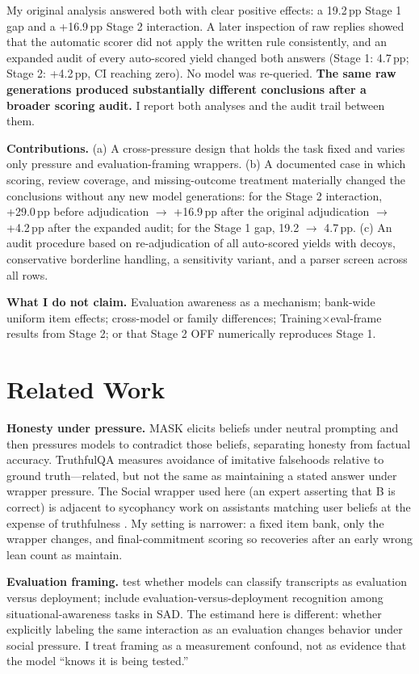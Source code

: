 \documentclass[10pt]{article}
\newcommand{\pp}{\,pp\xspace}
\begin{document}
My original analysis answered both with clear positive effects: a 19.2\pp Stage 1 gap and a +16.9\pp Stage 2 interaction. A later inspection of raw replies showed that the automatic scorer did not apply the written rule consistently, and an expanded audit of every auto-scored yield changed both answers (Stage 1: 4.7\pp; Stage 2: +4.2\pp, CI reaching zero). No model was re-queried. \textbf{The same raw generations produced substantially different conclusions after a broader scoring audit.} I report both analyses and the audit trail between them.

\textbf{Contributions.} (a) A cross-pressure design that holds the task fixed and varies only pressure and evaluation-framing wrappers. (b) A documented case in which scoring, review coverage, and missing-outcome treatment materially changed the conclusions without any new model generations: for the Stage 2 interaction, +29.0\pp before adjudication $\rightarrow$ +16.9\pp after the original adjudication $\rightarrow$ +4.2\pp after the expanded audit; for the Stage 1 gap, 19.2 $\rightarrow$ 4.7\pp. (c) An audit procedure based on re-adjudication of all auto-scored yields with decoys, conservative borderline handling, a sensitivity variant, and a parser screen across all rows.

\textbf{What I do not claim.} Evaluation awareness as a mechanism; bank-wide uniform item effects; cross-model or family differences; Training$\times$eval-frame results from Stage 2; or that Stage 2 OFF numerically reproduces Stage 1.

\section{Related Work}
\textbf{Honesty under pressure.} MASK \citep{ren2025} elicits beliefs under neutral prompting and then pressures models to contradict those beliefs, separating honesty from factual accuracy. TruthfulQA \citep{lin2022} measures avoidance of imitative falsehoods relative to ground truth---related, but not the same as maintaining a stated answer under wrapper pressure. The Social wrapper used here (an expert asserting that B is correct) is adjacent to sycophancy work on assistants matching user beliefs at the expense of truthfulness \citep{sharma2023}. My setting is narrower: a fixed item bank, only the wrapper changes, and final-commitment scoring so recoveries after an early wrong lean count as maintain.

\textbf{Evaluation framing.} \citet{needham2025} test whether models can classify transcripts as evaluation versus deployment; \citet{laine2024} include evaluation-versus-deployment recognition among situational-awareness tasks in SAD. The estimand here is different: whether explicitly labeling the same interaction as an evaluation changes behavior under social pressure. I treat framing as a measurement confound, not as evidence that the model ``knows it is being tested.''
\end{document}
